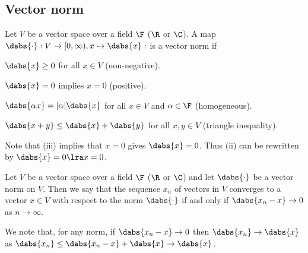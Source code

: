 \subsection{Vector norm}

\begin{definition}\label{def:norm_vector_space}
Let $V$ be a vector space over a field $\F$ ($\R$ or $\C$). A map $\dabs{\cdot}:V \to [0,\infty),x \mapsto \dabs{x}: $ is a vector norm if
\ben
\item [(i)] $\dabs{x} \geq 0$ for all $x \in V$ (non-negative).
\item [(ii)] $\dabs{x} = 0$ implies $x = 0$ (positive).
\item [(iii)] $\dabs{\alpha x} = |\alpha|\dabs{x}$ for all $x \in V$ and $\alpha \in \F$ (homogeneous).
\item [(iv)] $\dabs{x + y} \leq \dabs{x} + \dabs{y}$ for all $x, y \in V$ (triangle inequality).
\een
\end{definition}

\begin{remark}
Note that (iii) implies that $x=0$ gives $\dabs{x}=0$. Thus (ii) can be rewritten by $
\dabs{x} = 0\lra x=0$.
\end{remark}

\begin{definition}\label{def:convergence_vector_space}
Let $V$ be a vector space over a field $\F$ ($\R$ or $\C$) and let $\dabs{\cdot}$ be a vector norm on $V$. Then we say that the sequence $x_n$ of vectors in $V$ converges to a vector $x\in V$ with respect to the norm $\dabs{\cdot}$ if and only if $\dabs{x_n-x} \to 0$ as $n\to \infty$.
\end{definition}

\begin{remark}
We note that, for any norm, if $\dabs{x_n - x} \to 0$ then $\dabs{x_n} \to \dabs{x}$ as $\dabs{x_n}\leq \dabs{x_n-x}+\dabs{x} \to \dabs{x}$.
\end{remark}





